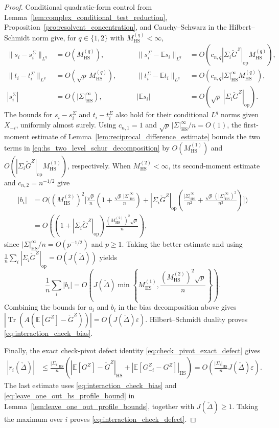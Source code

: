 \documentclass[EJP, preprint, NODS, nobera, nofontexpansion]{ejpecp}
\DeclareMathOperator{\op}{op}
\DeclareMathOperator{\tr}{Tr}
\DeclareMathOperator{\hs}{HS}
\begin{document}
\begin{proof}
Conditional quadratic-form control from
Lemma~\ref{lem:complex_conditional_test_reduction},
Proposition~\ref{pro:resolvent_concentration}, and Cauchy--Schwarz in the
Hilbert--Schmidt norm give, for $q\in\{1,2\}$ with $M_{\hs}^{(q)}<\infty$,
\begin{align*}
 \|s_i-s_i^\Sigma\|_{L^q}
 &=O(M_{\hs}^{(q)}),\qquad
 &\|s_i^\Sigma-\mathbb Es_i\|_{L^q}
 &=O\left(c_{n,q}|\Sigma_i\check G^Z|_{\op}M_{\hs}^{(q)}\right),\\
 \|t_i-t_i^\Sigma\|_{L^q}
 &=O(\sqrt p\,M_{\hs}^{(q)}),
 \qquad&\|t_i^\Sigma-\mathbb Et_i\|_{L^q}
 &=O\left(c_{n,q}|\Sigma|_{\hs}^\infty M_{\hs}^{(q)}\right),\\
 |s_i^\Sigma|&=O\left(|\Sigma|_{\hs}^\infty\right),
 \qquad&|\mathbb Es_i|&=O\left(\sqrt p\,|\Sigma_i\check G^Z|_{\op}\right).
\end{align*}
The bounds for \(s_i-s_i^\Sigma\) and \(t_i-t_i^\Sigma\)
also hold for their conditional \(L^q\) norms given \(X_{-i}\),
uniformly almost surely.
Using $c_{n,1}=1$ and $\sqrt p\,|\Sigma|_{\hs}^\infty/n=O(1)$, the first-moment estimate
of Lemma~\ref{lem:reciprocal_difference_estimate} bounds the two terms in
\eqref{eq:hs_two_level_schur_decomposition} by $O(M_{\hs}^{(1)})$
and $O\left(|\Sigma_i\check G^Z|_{\op}M_{\hs}^{(1)}\right)$, respectively.
When $M_{\hs}^{(2)}<\infty$,
its second-moment estimate and $c_{n,2}=n^{-1/2}$ give
\begin{align*}
 |b_i|
 &=O\Biggl((M_{\hs}^{(2)})^2\biggl[
   \frac{\sqrt p}{n}\left(1+\frac{\sqrt p\,|\Sigma|_{\hs}^\infty}{n}\right)
   +|\Sigma_i\check G^Z|_{\op}\left(
     \frac{|\Sigma|_{\hs}^\infty}{n^2}
     +\frac{\sqrt p\,(|\Sigma|_{\hs}^\infty)^2}{n^3}
   \right)\biggr]\Biggr)\\
   &=O\left(\left(1+|\Sigma_i\check G^Z|_{\op}\right)
   \frac{(M_{\hs}^{(2)})^2\sqrt p}{n}\right),
\end{align*}
since $|\Sigma|_{\hs}^\infty/n=O(p^{-1/2})$ and $p\geq1$.
Taking the better estimate and using
$\frac1n\sum_i|\Sigma_i\check G^Z|_{\op}=O(J(\check\Delta))$ yields
\[
 \frac1n\sum_i|b_i|
 =O\left(J(\check\Delta)
 \min\left\{M_{\hs}^{(1)},
             \frac{(M_{\hs}^{(2)})^2\sqrt p}{n}\right\}\right).
\]
Combining the bounds for $a_i$ and $b_i$
in the bias decomposition above gives
$|\tr(A(\mathbb E[G^Z]-\check G^Z))|=O(J(\check\Delta)\varepsilon)$.
Hilbert--Schmidt duality proves
\eqref{eq:interaction_check_bias}.

Finally, the exact check-pivot defect identity
\eqref{eq:check_pivot_exact_defect} gives
\begin{align*}
 |r_i(\check\Delta)|
 &\leq\frac{|\Sigma_i|_{\hs}}n
 \left(
 |\mathbb E[G^Z]-\check G^Z|_{\hs}
 +|\mathbb E[G_{-i}^Z-G^Z]|_{\hs}\right)
 =O\left(\frac{|\Sigma_i|_{\hs}}nJ(\check\Delta)\varepsilon\right).
\end{align*}
The last estimate uses \eqref{eq:interaction_check_bias} and
\eqref{eq:leave_one_out_hs_profile_bound} in
Lemma~\ref{lem:leave_one_out_profile_bounds}, together with
$J(\check\Delta)\geq1$.
Taking the maximum over $i$ proves
\eqref{eq:interaction_check_defect}.
\end{proof}
\end{document}
